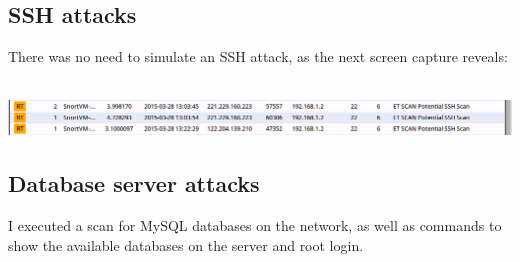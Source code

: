 \documentclass[11pt, a4paper]{article}
\begin{document}
\subsection*{SSH attacks}

There was no need to simulate an SSH attack, as the next screen capture reveals: \\ \\
\noindent\begin{minipage}{\textwidth}
    \centering
    \includegraphics[width=\textwidth]{SSH.png}
\end{minipage}

\subsection*{Database server attacks}

I executed a scan for MySQL databases on the network, as well as commands to show the available databases on the server and root login.
\end{document}
